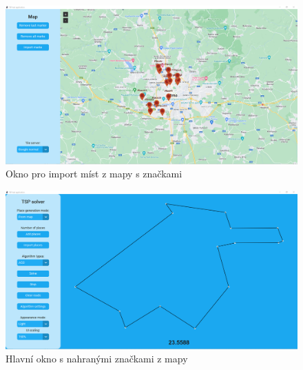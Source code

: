 \begin{figure}[H]
    \centering
    \includegraphics[width=15cm]{obrazky-figures/map_window_marks.png}
    \caption{Okno pro import míst z mapy s značkami}
    \label{fig:map_window}
\end{figure}
\begin{figure}[H]
    \centering
    \includegraphics[width=15cm]{obrazky-figures/normalized_solved.png}
    \caption{Hlavní okno s nahranými značkami z mapy}
    \label{fig:normalized}
\end{figure}


